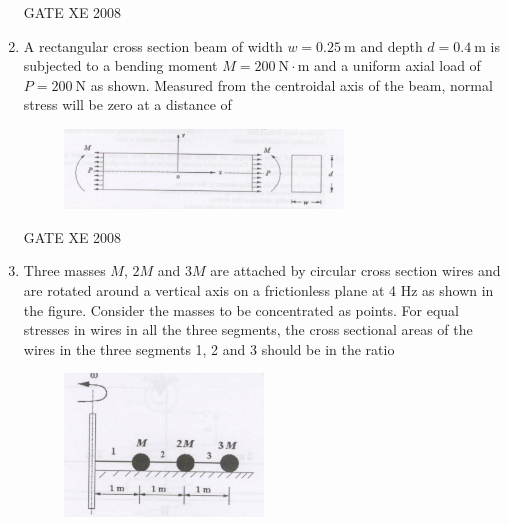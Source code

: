 \documentclass[12pt]{article}
\begin{document}
\begin{enumerate}[label=Q\arabic*.]
GATE XE 2008  

\item A rectangular cross section beam of width $w = 0.25 \ \text{m}$ and depth $d = 0.4 \ \text{m}$ is subjected to a bending moment $M = 200 \ \text{N} \cdot \text{m}$ and a uniform axial load of $P = 200 \ \text{N}$ as shown. Measured from the centroidal axis of the beam, normal stress will be zero at a distance of  

\begin{figure}[H]
\centering
  \includegraphics[width=0.7\textwidth]{figs/ass1_f_q13.png}
  \caption{}
\end{figure}

\begin{enumerate}[label=(\Alph*)]
\end{enumerate}

GATE XE 2008  


    \item Three masses $M$, $2M$ and $3M$ are attached by circular cross section wires and are rotated around a vertical axis on a frictionless plane at 4 Hz as shown in the figure. Consider the masses to be concentrated as points. For equal stresses in wires in all the three segments, the cross sectional areas of the wires in the three segments 1, 2 and 3 should be in the ratio

    \begin{figure}[H]
\centering
  \includegraphics[width=0.5\textwidth]{figs/ass1_f_q14.png}
  \caption{}
\end{figure}


\end{enumerate}
\end{document}
